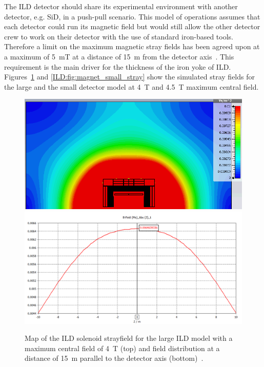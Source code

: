The ILD detector should share its experimental environment with another detector, e.g. SiD, in a push-pull scenario. This model of operations assumes that each detector could run its magnetic field but would still allow the other detector crew to work on their detector with the use of standard iron-based tools. Therefore a limit on the maximum magnetic stray fields has been agreed upon at a maximum of 5~mT at a distance of 15~m from the detector axis~\cite{Parker:2009zz}. This requirement is the main driver for the thickness of the iron yoke of ILD. Figures~\ref{ILD:fig:magnet_nominal_stray} and \ref{ILD:fig:magnet_small_stray} show the simulated stray fields for the large and the small detector model at 4~T and 4.5~T maximum central field.
\begin{figure}[h!]
    \centering
    \includegraphics[width=0.8\hsize]{Integration/fig/strayfield_nominal_4.png}
    \includegraphics[width=0.8\hsize]{Integration/fig/strayfield_nominal_4_plot.png}
    \caption{Map of the ILD solenoid strayfield for the large ILD model with a maximum central field of 4~T (top) and field distribution at a distance of 15~m parallel to the detector axis (bottom)~\cite{ild:bib:Magnet_Simulations}.}
    \label{ILD:fig:magnet_nominal_stray}
\end{figure}

